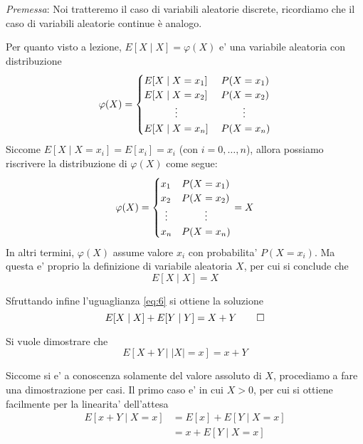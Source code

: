 \documentclass{homework}
\begin{document}
\exercise*[3.a] \label{es:3a}
\emph{Premessa}: Noi tratteremo il caso di variabili aleatorie discrete, ricordiamo che il caso di variabili aleatorie continue è analogo.

Per quanto visto a lezione, $E[X \mid X] = \varphi(X)$ e' una variabile aleatoria con distribuzione
\[
\varphi(X) = \begin{cases}
    E[X \mid X=x_1] &\;P(X=x_1) \\
    E[X \mid X=x_2] &\;P(X=x_2)\\
    \hfil \vdots & \hfil \vdots\\
    E[X \mid X=x_n] &\;P(X=x_n) \\
\end{cases}
\]
Siccome $E[X \mid X=x_i] = E[x_i] = x_i$ (con $i = 0, \dots, n$), allora possiamo riscrivere la distribuzione di $\varphi(X)$ come segue:
\[
\varphi(X) = \begin{cases}
    x_1 & P(X=x_1) \\
    x_2 & P(X=x_2)\\
    \hfil \vdots & \hfil \vdots\\
    x_n & P(X=x_n) \\
\end{cases} = X
\]
In altri termini, $\varphi(X)$ assume valore $x_i$ con probabilita' $P(X = x_i)$. Ma questa e' proprio la definizione di variabile aleatoria $X$,
per cui si conclude che
\begin{equation} \label{eq:6}
E[X \mid X] = X
\end{equation}

Sfruttando infine l'uguaglianza \ref{eq:6} si ottiene la soluzione   
\[
    E[X\mid X] + E[Y\mid Y] = X + Y \qed
\]

\exercise*[3.b] \label{es:3b}
Si vuole dimostrare che
\begin{equation} \label{eq:8}
    E[X + Y \mid |X| = x] = x + Y    
\end{equation}

Siccome si e' a conoscenza solamente del valore assoluto di $X$, procediamo a fare una dimostrazione per casi. 
Il primo caso e' in cui $X > 0$, per cui si ottiene facilmente per la linearita' dell'attesa
\[
\begin{align}
    E[x + Y \mid X = x] &= E[x] + E[Y \mid X = x] \\
                 &= x + E[Y \mid X = x]
\end{align}
\]
\end{document}

